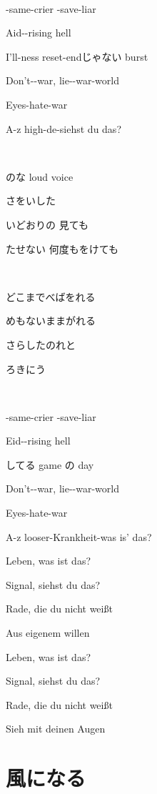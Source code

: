 \documentclass[12pt,a4paper]{article}
\begin{document}
~

-same-crier -save-liar

Aid--rising hell

I'll-ness reset-endじゃない burst

Don't--war, lie--war-world

Eyes-hate-war

A-z  high-de-siehst du das?

~

のな  loud voice

さをいした

いどおりの 見ても

たせない 何度もをけても

~

どこまでべばをれる

めもないままがれる

さらしたのれと

ろきにう

~

-same-crier -save-liar

Eid--rising hell

してる game の day

Don't--war, lie--war-world

Eyes-hate-war

A-z looser-Krankheit-was is' das?

Leben, was ist das?

Signal, siehst du das?

Rade, die du nicht weißt

Aus eigenem willen

Leben, was ist das?

Signal, siehst du das?

Rade, die du nicht weißt

Sieh mit deinen Augen


\section{風になる}
\end{document}
